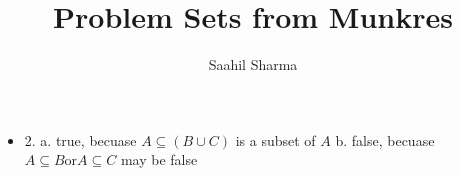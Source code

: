 \documentclass{article}
\title{Problem Sets from Munkres}
\author{Saahil Sharma}
\begin{document}
\begin{itemize}
	\item 2. 
	a. true, becuase $A \subseteq (B \cup C)$ is a subset of $A$
	b. false, becuase $A \subseteq B \text{or} A \subseteq C$ may be false
	
\end{itemize}
\end{document}
